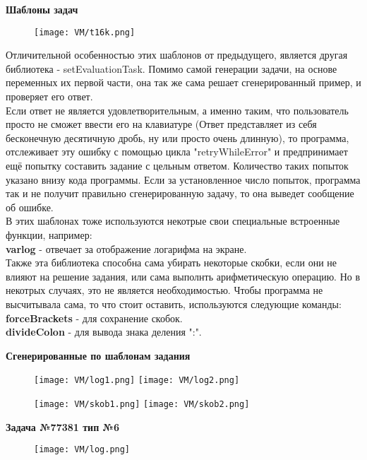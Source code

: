 \quad \textbf{Шаблоны задач}
\\
\begin{figure}[h]
		\centering
		\texttt{[image: VM/t16k.png]}
	\end{figure}
	
\quad Отличительной особенностью этих шаблонов от предыдущего, является другая библиотека - setEvaluationTask. Помимо самой генерации задачи, на основе переменных их первой части, она так же сама решает сгенерированный пример, и проверяет его ответ. 
\\ \quad Если ответ не является удовлетворительным, а именно таким, что пользователь просто не сможет ввести его на клавиатуре (Ответ представляет из себя бесконечную десятичную дробь, ну или просто очень длинную), то программа, отслеживает эту ошибку с помощью цикла "retryWhileError" и предпринимает ещё попытку составить задание с цельным ответом. Количество таких попыток указано внизу кода программы. Если за установленное число попыток, программа так и не получит правильно сгенерированную задачу, то она выведет сообщение об ошибке.
\\ \quad В этих шаблонах тоже используются некотрые свои специальные встроенные функции, например:
\\ \textbf{varlog} - отвечает за отображение логарифма на экране.
\\ \quad Также эта библиотека способна сама убирать некоторые скобки, если они не влияют на решение задания, или сама выполнть арифметическую операцию. Но в некотрых случаях, это не является необходимостью. Чтобы программа не высчитывала сама, то что стоит оставить, используются следующие команды:
\\ \textbf{forceBrackets} - для сохранение скобок.
\\ \textbf{divideColon} - для вывода знака деления ":".

\quad \textbf{Сгенерированные по шаблонам задания}

\begin{figure}[h]
		\centering
		\texttt{[image: VM/log1.png]}
		\texttt{[image: VM/log2.png]}
		\end{figure}
		\begin{figure}[h]
		\centering
		\texttt{[image: VM/skob1.png]}
		\texttt{[image: VM/skob2.png]}
\end{figure}
\quad \textbf{Задача №77381 тип №6}

\begin{figure}[h]
	\centering
	\texttt{[image: VM/log.png]}
\end{figure}

